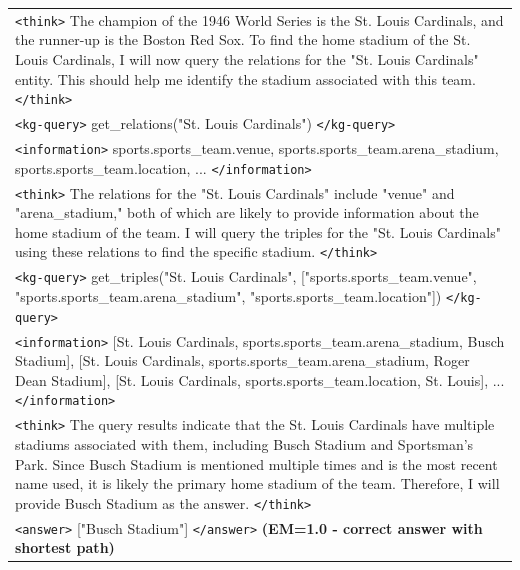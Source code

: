 {\begin{longtable}{>{\raggedright\arraybackslash}p{}}
\rowcolor{blue!10}
\texttt{<think>} The champion of the 1946 World Series is the St. Louis Cardinals, and the runner-up is the Boston Red Sox. To find the home stadium of the St. Louis Cardinals, I will now query the relations for the "St. Louis Cardinals" entity. This should help me identify the stadium associated with this team. \texttt{</think>} \\
\rowcolor{green!10}
\texttt{<kg-query>} get\_relations("St. Louis Cardinals") \texttt{</kg-query>} \\
\rowcolor{yellow!10}
\texttt{<information>} sports.sports\_team.venue, sports.sports\_team.arena\_stadium, sports.sports\_team.location, ... \texttt{</information>} \\
\rowcolor{blue!10}
\texttt{<think>} The relations for the "St. Louis Cardinals" include "venue" and "arena\_stadium," both of which are likely to provide information about the home stadium of the team. I will query the triples for the "St. Louis Cardinals" using these relations to find the specific stadium. \texttt{</think>} \\
\rowcolor{green!10}
\texttt{<kg-query>} get\_triples("St. Louis Cardinals", ["sports.sports\_team.venue", "sports.sports\_team.arena\_stadium", "sports.sports\_team.location"]) \texttt{</kg-query>} \\
\rowcolor{yellow!10}
\texttt{<information>} [St. Louis Cardinals, sports.sports\_team.arena\_stadium, Busch Stadium], [St. Louis Cardinals, sports.sports\_team.arena\_stadium, Roger Dean Stadium], [St. Louis Cardinals, sports.sports\_team.location, St. Louis], ... \texttt{</information>} \\
\rowcolor{blue!10}
\texttt{<think>} The query results indicate that the St. Louis Cardinals have multiple stadiums associated with them, including Busch Stadium and Sportsman's Park. Since Busch Stadium is mentioned multiple times and is the most recent name used, it is likely the primary home stadium of the team. Therefore, I will provide Busch Stadium as the answer. \texttt{</think>} \\
\hline
\rowcolor{green!20}
\texttt{<answer>} ["Busch Stadium"] \texttt{</answer>} \textbf{(EM=1.0 - correct answer with shortest path)} \\
\bottomrule
\end{longtable}
}



